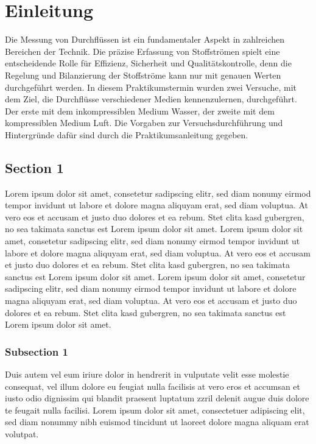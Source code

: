 \chapter{Einleitung}

Die Messung von Durchflüssen ist ein fundamentaler Aspekt in zahlreichen Bereichen der Technik. Die präzise Erfassung von Stoffströmen spielt eine entscheidende Rolle für Effizienz, Sicherheit und Qualitätskontrolle, denn die Regelung und Bilanzierung der Stoffströme kann nur mit genauen Werten durchgeführt werden. In diesem Praktikumstermin wurden zwei Versuche, mit dem Ziel, die Durchflüsse verschiedener Medien kennenzulernen, durchgeführt. Der erste mit dem inkompressiblen Medium Wasser, der zweite mit dem kompressiblen Medium Luft. Die Vorgaben zur Versuchsdurchführung und Hintergründe dafür sind durch die Praktikumsanleitung gegeben. \cite{waermeatlas} \cite{CanJour}

\section{Section 1}
Lorem ipsum dolor sit amet, consetetur sadipscing elitr, sed diam nonumy eirmod tempor invidunt ut labore et dolore magna aliquyam erat, sed diam voluptua. At vero eos et accusam et justo duo dolores et ea rebum. Stet clita kasd gubergren, no sea takimata sanctus est Lorem ipsum dolor sit amet. Lorem ipsum dolor sit amet, consetetur sadipscing elitr, sed diam nonumy eirmod tempor invidunt ut labore et dolore magna aliquyam erat, sed diam voluptua. At vero eos et accusam et justo duo dolores et ea rebum. Stet clita kasd gubergren, no sea takimata sanctus est Lorem ipsum dolor sit amet. Lorem ipsum dolor sit amet, consetetur sadipscing elitr, sed diam nonumy eirmod tempor invidunt ut labore et dolore magna aliquyam erat, sed diam voluptua. At vero eos et accusam et justo duo dolores et ea rebum. Stet clita kasd gubergren, no sea takimata sanctus est Lorem ipsum dolor sit amet.
\subsection{Subsection 1}
Duis autem vel eum iriure dolor in hendrerit in vulputate velit esse molestie consequat, vel illum dolore eu feugiat nulla facilisis at vero eros et accumsan et iusto odio dignissim qui blandit praesent luptatum zzril delenit augue duis dolore te feugait nulla facilisi. Lorem ipsum dolor sit amet, consectetuer adipiscing elit, sed diam nonummy nibh euismod tincidunt ut laoreet dolore magna aliquam erat volutpat.

